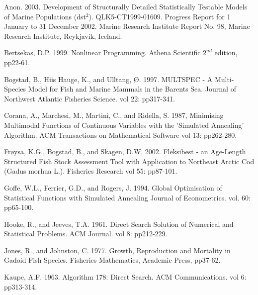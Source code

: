 \documentclass[10pt,twoside]{book}
\begin{document}
Anon. 2003. Development of Structurally Detailed Statistically Testable Models of Marine Populations (dst$^{2}$). QLK5-CT1999-01609. Progress Report for 1 January to 31 December 2002. Marine Research Institute Report No. 98, Marine Research Institute, Reykjavik, Iceland.\newline

Bertsekas, D.P. 1999. Nonlinear Programming. Athena Scientific $2^{nd}$ edition, pp22-61.\newline

Bogstad, B., Hiis Hauge, K., and Ulltang, {\O}. 1997. MULTSPEC - A Multi-Species Model for Fish and Marine Mammals in the Barents Sea. Journal of Northwest Atlantic Fisheries Science. vol 22: pp317-341.\newline


Corana, A., Marchesi, M., Martini, C., and Ridella, S. 1987, Minimising Multimodal Functions of Continuous Variables with the 'Simulated Annealing' Algorithm. ACM Transactions on Mathematical Software vol 13: pp262-280.\newline

Fr{\o}ysa, K.G., Bogstad, B., and Skagen, D.W. 2002. Fleksibest - an Age-Length Structured Fish Stock Assessment Tool with Application to Northeast Arctic Cod (Gadus morhua L.). Fisheries Research vol 55: pp87-101.\newline

Goffe, W.L., Ferrier, G.D., and Rogers, J. 1994. Global Optimisation of Statistical Functions with Simulated Annealing Journal of Econometrics. vol. 60: pp65-100.\newline

Hooke, R., and Jeeves, T.A. 1961. Direct Search Solution of Numerical and Statistical Problems. ACM Journal. vol 8: pp212-229.\newline

Jones, R., and Johnston, C. 1977. Growth, Reproduction and Mortality in Gadoid Fish Species. Fisheries Mathematics, Academic Press, pp37-62.\newline

Kaupe, A.F. 1963. Algorithm 178: Direct Search. ACM Communications. vol 6: pp313-314.\newline
\end{document}
